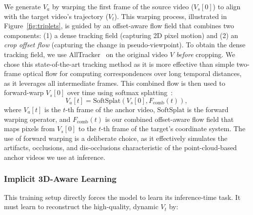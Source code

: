 We generate $V_{a}$ by warping the first frame of the source video ($V_{s}[0]$) to align with the target video's trajectory ($V_{t}$). This warping process, illustrated in Figure~\ref{fig:triplets}, is guided by an offset-aware flow field that combines two components: (1) a dense tracking field (capturing 2D pixel motion) and (2) an \textit{crop offset flow} (capturing the change in pseudo-viewpoint). To obtain the dense tracking field, we use AllTracker~\cite{4d_recon_harley2025alltracker} on the original video $V$ \textit{before} cropping. We chose this state-of-the-art tracking method as it is more effective than simple two-frame optical flow for computing correspondences over long temporal distances, as it leverages all intermediate frames. This combined flow is then used to forward-warp $V_{s}[0]$ over time using softmax splatting~\cite{softmax_splatting}:
\begin{equation}
V_{a}[t] = \text{SoftSplat}(V_s[0], F_{\text{comb}}(t)),
\label{eq:anchor_warping}
\end{equation}
where $V_a[t]$ is the $t$-th frame of the anchor video, $\text{SoftSplat}$ is the forward warping operator, and $F_{\text{comb}}(t)$ is our combined offset-aware flow field that maps pixels from $V_s[0]$ to the $t$-th frame of the target's coordinate system. The use of forward warping is a deliberate choice, as it effectively simulates the artifacts, occlusions, and dis-occlusions characteristic of the point-cloud-based anchor videos we use at inference.

\subsubsection{Implicit 3D-Aware Learning}
\label{sec:implicit_3d_learning}

This training setup directly forces the model to learn its inference-time task. It must learn to reconstruct the high-quality, dynamic $V_{t}$ by:

